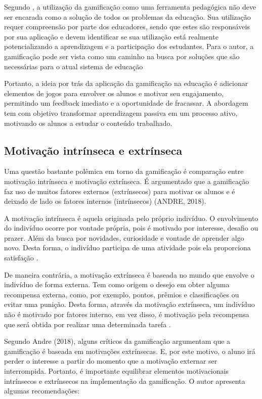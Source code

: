 \documentclass[
	12pt,				%
	oneside,			%
	a4paper,			%
	english,			%
	french,				%
	spanish,			%
	brazil,				%
	]{abntex2}
\begin{document}
Segundo \citet{fardo2013gamificaccao}, a utilização da gamificação como uma ferramenta pedagógica não deve ser encarada como a solução de todos os problemas da educação. Sua utilização requer compreensão por parte dos educadores, sendo que estes são responsáveis por sua aplicação e devem identificar se sua utilização está realmente potencializando a aprendizagem e a participação dos estudantes. Para o autor, a gamificação pode ser vista como um caminho na busca por soluções que são necessárias para o atual sistema de educação

Portanto, a ideia por trás da aplicação da gamificação na educação é adicionar elementos de jogos para envolver os alunos e motivar seu engajamento, permitindo um feedback imediato e a oportunidade de fracassar. A abordagem tem com objetivo transformar aprendizagem passiva em um processo ativo, motivando os alunos a estudar o conteúdo trabalhado.

\subsection{Motivação intrínseca e extrínseca}

Uma questão bastante polêmica em torno da gamificação é comparação entre motivação intrínseca e motivação extrínseca. É argumentado que a gamificação faz uso de muitos fatores externos (extrínsecos) para motivar os alunos e é deixado de lado os fatores internos (intrínsecos) (ANDRE, 2018).

A motivação intrínseca é aquela originada pelo próprio indivíduo. O envolvimento do indivíduo ocorre por vontade própria,  pois é motivado por interesse, desafio ou prazer. Além da busca por novidades, curiosidade e vontade de aprender algo novo. Desta forma, o indivíduo participa de uma atividade pois ela proporciona satisfação \cite{busarello2016gamificaccao}.

De maneira contrária, a motivação extrínseca é baseada no mundo que envolve o indivíduo de forma externa. Tem como origem o desejo em obter alguma recompensa externa, como, por exemplo, pontos, prêmios e classificações ou evitar uma punição. Desta forma, através da motivação extrínseca, um indivíduo não é motivado por fatores interno, em vez disso, é motivação pela recompensa que será obtida por realizar uma determinada tarefa \cite{busarello2016gamificaccao}.

Segundo Andre (2018), alguns críticos da gamificação argumentam que a gamificação é baseada em motivações extrínsecas. E, por este motivo, o aluno irá perder o interesse a partir do momento que a motivação externar ser interrompida. Portanto, é importante equilibrar elementos motivacionais intrínsecos e extrínsecos na implementação da gamificação. O autor apresenta algumas recomendações:
\end{document}
